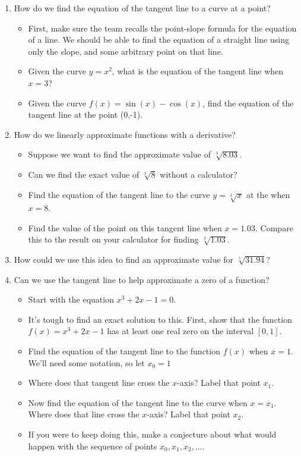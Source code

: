 \documentclass{article}
\begin{document}
\begin{enumerate}
\item How do we find the equation of the tangent line to a curve at a point?
\begin{itemize}
\item First, make sure the team recalls the point-slope formula for the equation of a line. We should be able to find the equation of a straight line using only the slope, and some arbitrary point on that line.
\item Given the curve $y = x^2$, what is the equation of the tangent line when $x = 3$?
\item Given the curve $f(x) = \sin(x) - \cos(x)$, find the equation of the tangent line at the point (0,-1).
\end{itemize} 

\item How do we linearly approximate functions with a derivative? 
\begin{itemize}
\item Suppose we want to find the approximate value of $\sqrt[3]{8.03}$.
\item Can we find the exact value of $\sqrt[3]{8}$ without a calculator? 
\item Find the equation of the tangent line to the curve $y = \sqrt[3]{x}$ at the when $x = 8$.
\item Find the value of the point on this tangent line when $x = 1.03$. Compare this to the result on your calculator for finding $\sqrt[3]{1.03}$.
\end{itemize}

\item How could we use this idea to find an approximate value for $\sqrt[5]{31.94}$?

\item Can we use the tangent line to help approximate a zero of a function?
\begin{itemize}
    \item Start with the equation $x^3 + 2x - 1 = 0$.
    \item It's tough to find an exact solution to this. First, show that the function $f(x) = x^3 + 2x - 1$ has at least one real zero on the interval $[0,1]$.
    \item Find the equation of the tangent line to the function $f(x)$ when $x = 1$. We'll need some notation, so let $x_0 = 1$
    \item Where does that tangent line cross the $x$-axis? Label that point $x_1$.
    \item Now find the equation of the tangent line to the curve when $x = x_1$. Where does that line cross the $x$-axis? Label that point $x_2$.
    \item If you were to keep doing this, make a conjecture about what would happen with the sequence of points $x_0, x_1, x_2, \ldots$.
\end{itemize}
\end{enumerate}
\end{document}

